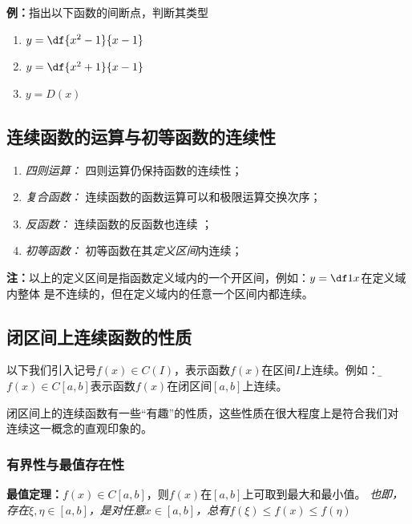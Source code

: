 \begin{enumerate}[(1)]
\begin{itemize}
\begin{center}
 	\end{center}
  \end{itemize}
\end{enumerate}

{\bf 例：}指出以下函数的间断点，判断其类型
\begin{enumerate}[(1)]
  \setlength{\itemindent}{1cm}
  \item $y=\df{x^2-1}{x-1}$
  \item $y=\df{x^2+1}{x-1}$
  \item $y=D(x)$
\end{enumerate}

\subsection{连续函数的运算与初等函数的连续性}

\begin{enumerate}[(1)]
  \setlength{\itemindent}{1cm}
  \item {\it 四则运算：} 四则运算仍保持函数的连续性； 
  \item {\it 复合函数：} 连续函数的函数运算可以和极限运算交换次序； 
  \item {\it 反函数：} 连续函数的反函数也连续 ；
  \item {\it 初等函数：} 初等函数在其{\it 定义区间}内连续；
\end{enumerate}

{\bf 注：}以上的定义区间是指函数定义域内的一个开区间，例如：$y=\df1x$在定义域内整体
是不连续的，但在定义域内的任意一个区间内都连续。

\subsection{闭区间上连续函数的性质}

以下我们引入记号$f(x)\in C(I)$，表示函数$f(x)$在区间$I$上连续。例如：
{\b$f(x)\in C[a,b]$表示函数$f(x)$在闭区间$[a,b]$上连续}。

闭区间上的连续函数有一些“有趣”的性质，这些性质在很大程度上是符合我们对
连续这一概念的直观印象的。

\subsubsection{有界性与最值存在性}

\begin{thx}
	{\bf 最值定理：}$f(x)\in C[a,b]$，则$f(x)$在$[a,b]$上可取到最大和最小值。
	{\it 也即，存在$\xi,\eta\in[a,b]$，是对任意$x\in[a,b]$，总有$f(\xi)
	\leq f(x)\leq f(\eta)$}
\end{thx}

